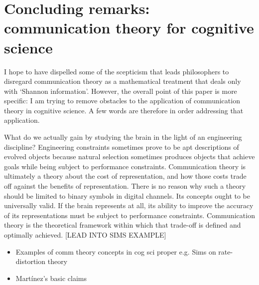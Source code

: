 \section{\sloppy Concluding remarks: communication theory for cognitive science}\label{sec:conclusion}

I hope to have dispelled some of the scepticism that leads philosophers to disregard communication theory as a mathematical treatment that deals only with `Shannon information'.
However, the overall point of this paper is more specific: I am trying to remove obstacles to the application of communication theory in cognitive science.
A few words are therefore in order addressing that application.

What do we actually gain by studying the brain in the light of an engineering discipline?
Engineering constraints sometimes prove to be apt descriptions of evolved objects because natural selection sometimes produces objects that achieve goals while being subject to performance constraints.
Communication theory is ultimately a theory about the cost of representation, and how those costs trade off against the benefits of representation.
There is no reason why such a theory should be limited to binary symbols in digital channels.
Its concepts ought to be universally valid.
If the brain represents at all, its ability to improve the accuracy of its representations must be subject to performance constraints.
Communication theory is the theoretical framework within which that trade-off is defined and optimally achieved.
[LEAD INTO SIMS EXAMPLE]

\begin{itemize}
    \item Examples of comm theory concepts in cog sci proper e.g. Sims on rate-distortion theory
    \item Mart\'{i}nez's basic claims
\end{itemize}